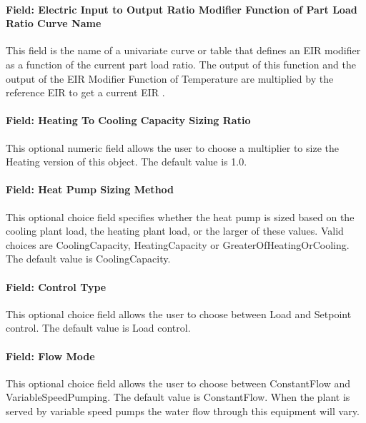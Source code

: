 \paragraph{Field: Electric Input to Output Ratio Modifier Function of Part Load Ratio Curve Name}\label{plhp_eir_heating_inputs_eirfplr}

This field is the name of a univariate curve or table that defines an EIR modifier as a function of the current part load ratio. The output of this function and the output of the EIR Modifier Function of Temperature are multiplied by the reference EIR to get a current EIR .

\paragraph{Field: Heating To Cooling Capacity Sizing Ratio}\label{plhp_eir_heating_inputs_heating_to_cooling_capacity_sizing_ratio}

This optional numeric field allows the user to choose a multiplier to size the Heating version of this object. The default value is 1.0.

\paragraph{Field: Heat Pump Sizing Method}\label{plhp_eir_heating_inputs_heat_pump_sizing_method}

This optional choice field specifies whether the heat pump is sized based on the cooling plant load, the heating plant load, or the larger of these values. Valid choices are CoolingCapacity, HeatingCapacity or GreaterOfHeatingOrCooling. The default value is CoolingCapacity.

\paragraph{Field: Control Type}\label{plhp_eir_heating_inputs_control_type}

This optional choice field allows the user to choose between Load and Setpoint control. The default value is Load control.

\paragraph{Field: Flow Mode}\label{plhp_eir_heating_inputs_flow_mode}

This optional choice field allows the user to choose between ConstantFlow and VariableSpeedPumping. The default value is ConstantFlow. When the plant is served by variable speed pumps the water flow through this equipment will vary.

